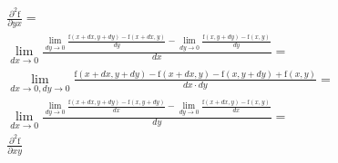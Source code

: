 \begin{equation}
\begin{split}
\frac{\partial^2 \mathrm{f}}{\partial yx} = \\
\lim_{dx \to 0} \frac{\lim_{dy \to 0} \frac{\mathrm{f}(x+dx, y+dy) - \mathrm{f}(x+dx, y)}{dy} - \lim_{dy \to 0} \frac{\mathrm{f}(x, y+dy) - \mathrm{f}(x, y)}{dy}}{dx} = \\
\lim_{dx \to 0, dy \to 0} \frac{\mathrm{f}(x+dx, y+dy) - \mathrm{f}(x+dx, y) - \mathrm{f}(x, y+dy) + \mathrm{f}(x, y)}{dx \cdot dy} = \\
\lim_{dx \to 0} \frac{\lim_{dy \to 0} \frac{\mathrm{f}(x+dx, y+dy) - \mathrm{f}(x, y+dy)}{dx} - \lim_{dy \to 0} \frac{\mathrm{f}(x+dx, y) - \mathrm{f}(x, y)}{dx}}{dy} = \\
\frac{\partial^2 \mathrm{f}}{\partial xy}
\end{split}
\end{equation}

